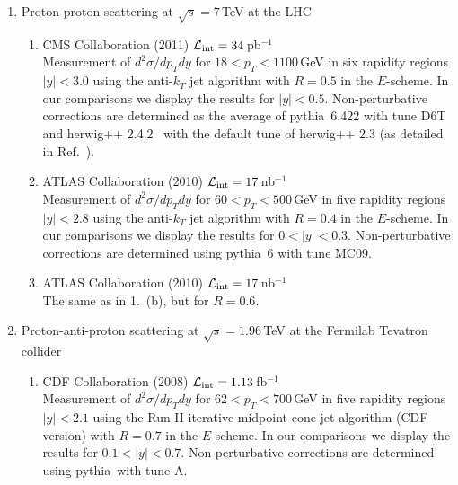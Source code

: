\documentclass[11pt]{article}
\newcommand{\pythia}{{\sc pythia}}
\newcommand{\herwig}{{\sc herwig}}
\begin{document}
\begin{enumerate}

\item Proton-proton scattering at $\sqrt{s} = 7\,$TeV at the LHC
\begin{enumerate}

\item CMS Collaboration (2011) 
      ${\cal L_{\rm int}}=34\,$pb$^{-1}$~\cite{:2011me}  \\
Measurement of
$d^2\sigma/dp_T dy$ for $18<p_T<1100\,$GeV
      in six rapidity regions $|y|<3.0$ 
using the
anti-$k_T$ jet algorithm with $R=0.5$ in the $E$-scheme. 
In our comparisons we display the results for $|y|<0.5$.  
Non-perturbative corrections are determined 
as the average of \pythia\ 6.422 with tune D6T~\cite{Field:2008zz}
and \herwig++ 2.4.2~\cite{Bahr:2008pv} with the default tune
of \herwig++ 2.3
(as detailed in Ref.~\cite{Rabbertz:2011}).



\item ATLAS Collaboration (2010) 
      ${\cal L_{\rm int}}=17\,$nb$^{-1}$~\cite{:2010wv} \\
Measurement of
$d^2\sigma/dp_T dy$  for $60<p_T<500\,$GeV
     in five rapidity regions $|y|<2.8$ 
using the 
anti-$k_T$ jet algorithm with $R=0.4$ in the $E$-scheme. 
In our comparisons we display the results for $0<|y|<0.3$.   
Non-perturbative corrections are determined 
using \pythia\ 6 with tune MC09.



\item ATLAS Collaboration (2010) 
      ${\cal L_{\rm int}}=17\,$nb$^{-1}$~\cite{:2010wv}  \\
The same as in 1.~(b), but for $R=0.6$.


\end{enumerate}


\item Proton-anti-proton scattering at $\sqrt{s} = 1.96\,$TeV at the Fermilab Tevatron collider
\begin{enumerate}

\item CDF Collaboration (2008) 
      ${\cal L_{\rm int}}=1.13\,$fb$^{-1}$~\cite{Aaltonen:2008eq} \\
Measurement of
$d^2\sigma/dp_T dy$  for $62<p_T<700\,$GeV
     in five rapidity regions $|y|<2.1$ 
using the
Run II iterative midpoint cone jet algorithm (CDF version) with $R=0.7$ 
in the $E$-scheme. 
In our comparisons we display the results for $0.1<|y|<0.7$.  
Non-perturbative corrections are determined 
using \pythia\ with tune A.



\end{enumerate}
\end{enumerate}
\end{document}
